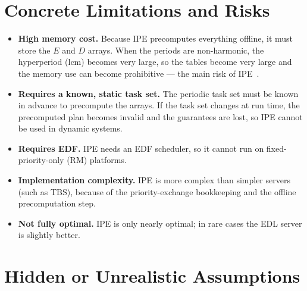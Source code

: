 \documentclass[conference]{IEEEtran}
\begin{document}
\section{Concrete Limitations and Risks}

\begin{itemize}
  \item \textbf{High memory cost.} Because IPE precomputes everything offline,
        it must store the $E$ and $D$ arrays. When the periods are non-harmonic,
        the hyperperiod (lcm) becomes very large, so the tables become very
        large and the memory use can become prohibitive --- the main risk of
        IPE~\cite{buttazzo}.
  \item \textbf{Requires a known, static task set.} The periodic task set must
        be known in advance to precompute the arrays. If the task set changes
        at run time, the precomputed plan becomes invalid and the guarantees
        are lost, so IPE cannot be used in dynamic systems.
  \item \textbf{Requires EDF.} IPE needs an EDF scheduler, so it cannot run on
        fixed-priority-only (RM) platforms.
  \item \textbf{Implementation complexity.} IPE is more complex than simpler
        servers (such as TBS), because of the priority-exchange bookkeeping and
        the offline precomputation step.
  \item \textbf{Not fully optimal.} IPE is only nearly optimal; in rare cases
        the EDL server is slightly better.
\end{itemize}

\section{Hidden or Unrealistic Assumptions}
\end{document}
